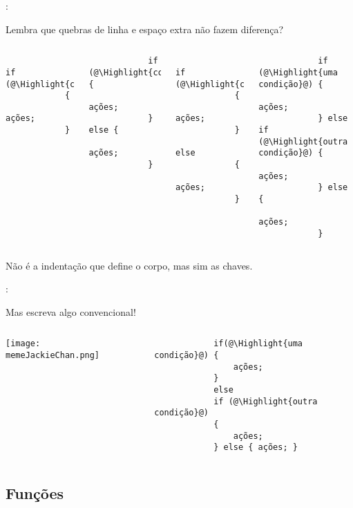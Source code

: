 \begin{frame}[fragile]{\insertsection: \insertsubsection}

	Lembra que quebras de linha e espaço extra não fazem diferença?
	\begin{columns}[t]
		\begin{verbatim}
			if (@\Highlight{condição}@)
			{
				ações;
			}
		\end{verbatim}

		\vspace{-\medskipamount}
		\begin{verbatim}
			if (@\Highlight{condição}@) {
				ações;
			} else {
				ações;
			}
		\end{verbatim}

		\begin{verbatim}
			if (@\Highlight{condição}@)
			{
				ações;
			}
			else
			{
				ações;
			}
		\end{verbatim}

		\begin{verbatim}
			if (@\Highlight{uma condição}@) {
				ações;
			} else if (@\Highlight{outra condição}@) {
				ações;
			} else {
				ações;
			}
		\end{verbatim}
	\end{columns}
	Não é a indentação que define o corpo, mas sim as chaves.

\end{frame}


\begin{frame}[fragile]{\insertsection: \insertsubsection}

	Mas escreva algo convencional!
	\begin{columns}[T]
	\centering
		\texttt{[image: memeJackieChan.png]}

		\bigskip\\
		\begin{verbatim}
			if(@\Highlight{uma condição}@) {
				ações;
			}
			else
			if (@\Highlight{outra condição}@)
			{
				ações;
			} else { ações; }
		\end{verbatim}
	\end{columns}

\end{frame}


\subsection{Funções}



